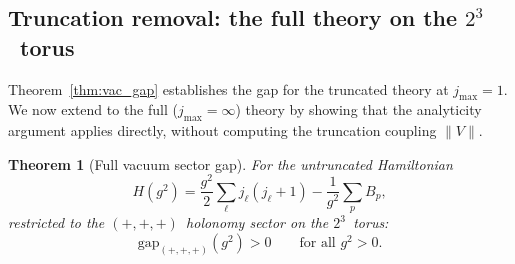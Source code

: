 \documentclass[12pt,a4paper]{article}
\newtheorem{theorem}{Theorem}[section]
\begin{document}
\subsection{Truncation removal: the full theory on the $2^3$~torus}\label{sec:truncation}

Theorem~\ref{thm:vac_gap} establishes the gap for the truncated theory at $j_{\max}=1$. We now extend to the full ($j_{\max}=\infty$) theory by showing that the analyticity argument applies directly, without computing the truncation coupling $\|V\|$.

\begin{theorem}[Full vacuum sector gap]\label{thm:full_gap}
For the untruncated Hamiltonian
\begin{equation}
H(g^2) = \frac{g^2}{2}\sum_\ell j_\ell(j_\ell+1) - \frac{1}{g^2}\sum_p B_p,
\end{equation}
restricted to the $(+,+,+)$~holonomy sector on the $2^3$~torus:
\begin{equation}
\mathrm{gap}_{(+,+,+)}(g^2) > 0 \qquad \text{for all } g^2 > 0.
\end{equation}
\end{theorem}
\end{document}
